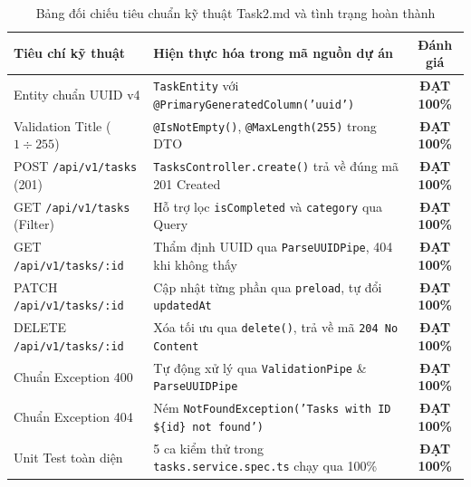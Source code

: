 \documentclass[12pt,a4paper,oneside]{book}
\begin{document}
\begin{table}[htbp]
  \centering
  \small
  \caption{Bảng đối chiếu tiêu chuẩn kỹ thuật Task2.md và tình trạng hoàn thành}
  \label{tab:checklist-pedagogy}
  \begin{tabularx}{\textwidth}{p{4.2cm} X c}
    \toprule
    \textbf{Tiêu chí kỹ thuật} & \textbf{Hiện thực hóa trong mã nguồn dự án} & \textbf{Đánh giá} \\
    \midrule
    Entity chuẩn UUID v4 & \texttt{TaskEntity} với \texttt{@PrimaryGeneratedColumn('uuid')} & \textbf{ĐẠT 100\%} \\
    Validation Title ($1 \div 255$) & \texttt{@IsNotEmpty()}, \texttt{@MaxLength(255)} trong DTO & \textbf{ĐẠT 100\%} \\
    POST \texttt{/api/v1/tasks} (201) & \texttt{TasksController.create()} trả về đúng mã 201 Created & \textbf{ĐẠT 100\%} \\
    GET \texttt{/api/v1/tasks} (Filter) & Hỗ trợ lọc \texttt{isCompleted} và \texttt{category} qua Query & \textbf{ĐẠT 100\%} \\
    GET \texttt{/api/v1/tasks/:id} & Thẩm định UUID qua \texttt{ParseUUIDPipe}, 404 khi không thấy & \textbf{ĐẠT 100\%} \\
    PATCH \texttt{/api/v1/tasks/:id} & Cập nhật từng phần qua \texttt{preload}, tự đổi \texttt{updatedAt} & \textbf{ĐẠT 100\%} \\
    DELETE \texttt{/api/v1/tasks/:id} & Xóa tối ưu qua \texttt{delete()}, trả về mã \texttt{204 No Content} & \textbf{ĐẠT 100\%} \\
    Chuẩn Exception 400 & Tự động xử lý qua \texttt{ValidationPipe} \& \texttt{ParseUUIDPipe} & \textbf{ĐẠT 100\%} \\
    Chuẩn Exception 404 & Ném \texttt{NotFoundException('Tasks with ID \$\{id\} not found')} & \textbf{ĐẠT 100\%} \\
    Unit Test toàn diện & 5 ca kiểm thử trong \texttt{tasks.service.spec.ts} chạy qua 100\% & \textbf{ĐẠT 100\%} \\
    \bottomrule
  \end{tabularx}
\end{table}
\end{document}
